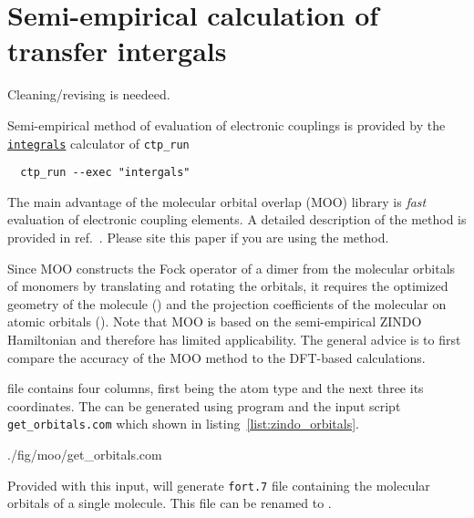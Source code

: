 \section{Semi-empirical calculation of transfer intergals}
\label{sec:moo}

{\color{red} Cleaning/revising is needeed.}

\newcommand{\integrals}{\hyperref[calc:integrals]{\texttt{integrals}}\xspace}

Semi-empirical method of evaluation of electronic couplings is provided by the \integrals calculator of \texttt{ctp\_run} 
\begin{verbatim}
  ctp_run --exec "intergals"
\end{verbatim}

The main advantage of the molecular orbital overlap (MOO) library is {\em fast} evaluation of electronic coupling elements. A detailed description of the method is provided in ref.~\cite{kirkpatrick_approximate_2008}. Please site this paper if you are using the method.

Since MOO constructs the Fock operator of a dimer from the  molecular orbitals of monomers by translating and rotating the orbitals, it requires the optimized geometry of the molecule (\xyz) and the projection coefficients of the molecular on atomic orbitals (\orb). Note that MOO is based on the semi-empirical ZINDO Hamiltonian and therefore has limited applicability. The general advice is to first compare the accuracy of the MOO method to the DFT-based calculations. 

\xyz file contains four columns, first being the atom type and the next three its coordinates. The \orb can be generated using \gaussian program and the input script \texttt{get\_orbitals.com} which shown in listing~\ref{list:zindo_orbitals}.

%
{./fig/moo/get_orbitals.com}

Provided with this input, \gaussian will generate \texttt{fort.7} file containing the molecular orbitals of a single molecule. This file can be renamed to \orb. 

